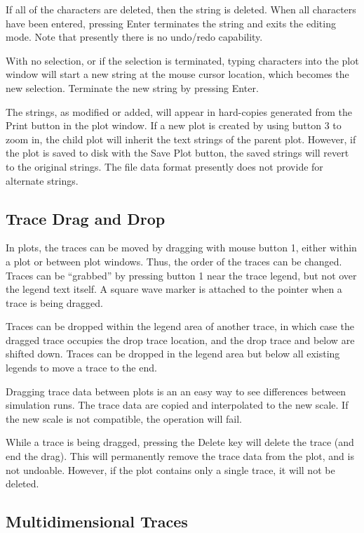 If all of the characters are deleted, then the string is deleted. 
When all characters have been entered, pressing {\cb Enter}
terminates the string and exits the editing mode.  Note that
presently there is no undo/redo capability.

With no selection, or if the selection is terminated, typing
characters into the plot window will start a new string at the mouse
cursor location, which becomes the new selection.  Terminate the new
string by pressing {\kb Enter}.

The strings, as modified or added, will appear in hard-copies
generated from the {\cb Print} button in the plot window.  If a new
plot is created by using button 3 to zoom in, the child plot will
inherit the text strings of the parent plot.  However, if the plot is
saved to disk with the {\cb Save Plot} button, the saved strings will
revert to the original strings.  The file data format presently does
not provide for alternate strings.

\subsection{Trace Drag and Drop}

In plots, the traces can be moved by dragging with mouse button 1,
either within a plot or between plot windows.  Thus, the order of the
traces can be changed.  Traces can be ``grabbed'' by pressing button 1
near the trace legend, but not over the legend text itself.  A square
wave marker is attached to the pointer when a trace is being dragged.

Traces can be dropped within the legend area of another trace, in
which case the dragged trace occupies the drop trace location, and the
drop trace and below are shifted down.  Traces can be dropped in the
legend area but below all existing legends to move a trace to the end.

Dragging trace data between plots is an an easy way to see differences
between simulation runs.  The trace data are copied and interpolated
to the new scale.  If the new scale is not compatible, the operation
will fail.

While a trace is being dragged, pressing the {\kb Delete} key will
delete the trace (and end the drag).  This will permanently remove the
trace data from the plot, and is not undoable.  However, if the plot
contains only a single trace, it will not be deleted.

\subsection{Multidimensional Traces}

